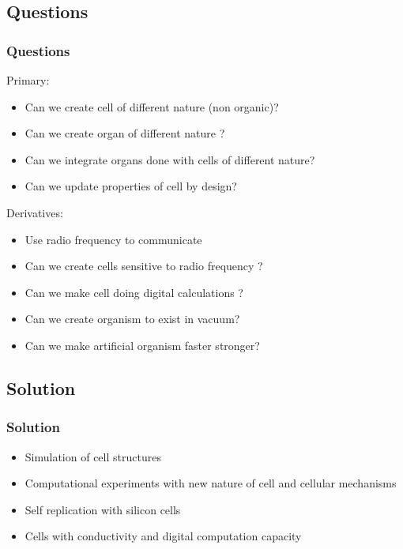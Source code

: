 \subsection{Questions}
\begin{frame}
\frametitle{Questions}

Primary:
\begin{itemize}
\item Can we create cell of different nature (non organic)?
\item Can we create organ of different nature ?
\item Can we integrate organs done with cells of different nature?
\item Can we update properties of cell by design?
\end{itemize}

Derivatives:
\begin{itemize}
\item Use radio frequency to communicate
\item  Can we create cells sensitive to radio frequency ?
\item  Can we make cell doing digital calculations ?
\item  Can we create organism to exist in vacuum?
\item  Can we make artificial organism faster stronger?
\end{itemize}
\end{frame}

\subsection{Solution}
\begin{frame}
\frametitle{Solution}

\begin{itemize}
\item Simulation of cell structures
\item Computational experiments with new nature of cell and cellular mechanisms
\item Self replication with silicon cells
\item Cells with conductivity and digital computation capacity
\end{itemize}

\end{frame}
